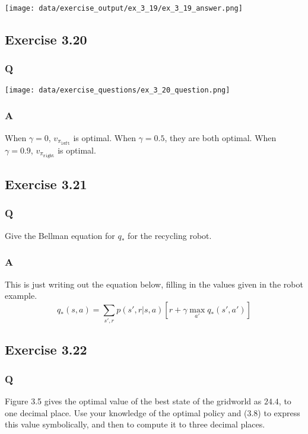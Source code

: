 \texttt{[image: data/exercise\_output/ex\_3\_19/ex\_3\_19\_answer.png]}


\subsection{Exercise 3.20}
\subsubsection{Q}
\texttt{[image: data/exercise\_questions/ex\_3\_20\_question.png]}
 
\subsubsection{A}
When $\gamma=0$, $v_{\pi_{\mathtt{left}}}$ is optimal. When $\gamma = 0.5$, they are both optimal. When $\gamma=0.9$, $v_{\pi_{\mathtt{right}}}$ is optimal.

\subsection{Exercise 3.21}
\subsubsection{Q}
Give the Bellman equation for $q_*$ for the recycling robot.

\subsubsection{A}
This is just writing out the equation below, filling in the values given in the robot example.
\begin{equation}
    q_*(s, a) = \sum_{s', r} p(s', r | s, a)[r + \gamma \max_{a'} q_*(s', a')]
\end{equation}

\subsection{Exercise 3.22}
\subsubsection{Q}
Figure 3.5 gives the optimal value of the best state of the gridworld as $24.4$, to one decimal place. Use your knowledge of the optimal policy and (3.8) to express this value symbolically, and then to compute it to three decimal places.

